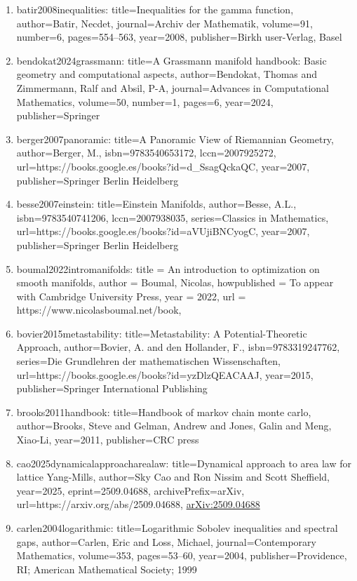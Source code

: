 \documentclass[11pt]{article}
\begin{document}
\begin{enumerate}[leftmargin=*]
  \item batir2008inequalities: title=Inequalities for the gamma function, author=Batir, Necdet, journal=Archiv der Mathematik, volume=91, number=6, pages=554--563, year=2008, publisher=Birkh user-Verlag, Basel
  \item bendokat2024grassmann: title=A Grassmann manifold handbook: Basic geometry and computational aspects, author=Bendokat, Thomas and Zimmermann, Ralf and Absil, P-A, journal=Advances in Computational Mathematics, volume=50, number=1, pages=6, year=2024, publisher=Springer
  \item berger2007panoramic: title=A Panoramic View of Riemannian Geometry, author=Berger, M., isbn=9783540653172, lccn=2007925272, url=https://books.google.es/books?id=d\_SsagQckaQC, year=2007, publisher=Springer Berlin Heidelberg
  \item besse2007einstein: title=Einstein Manifolds, author=Besse, A.L., isbn=9783540741206, lccn=2007938035, series=Classics in Mathematics, url=https://books.google.es/books?id=aVUjiBNCyogC, year=2007, publisher=Springer Berlin Heidelberg
  \item boumal2022intromanifolds: title = An introduction to optimization on smooth manifolds, author = Boumal, Nicolas, howpublished = To appear with Cambridge University Press, year = 2022, url = https://www.nicolasboumal.net/book,
  \item bovier2015metastability: title=Metastability: A Potential-Theoretic Approach, author=Bovier, A. and den Hollander, F., isbn=9783319247762, series=Die Grundlehren der mathematischen Wissenschaften, url=https://books.google.es/books?id=yzDlzQEACAAJ, year=2015, publisher=Springer International Publishing
  \item brooks2011handbook: title=Handbook of markov chain monte carlo, author=Brooks, Steve and Gelman, Andrew and Jones, Galin and Meng, Xiao-Li, year=2011, publisher=CRC press
  \item cao2025dynamicalapproacharealaw: title=Dynamical approach to area law for lattice Yang-Mills, author=Sky Cao and Ron Nissim and Scott Sheffield, year=2025, eprint=2509.04688, archivePrefix=arXiv, url=https://arxiv.org/abs/2509.04688, \href{https://arxiv.org/abs/2509.04688}{arXiv:2509.04688}
  \item carlen2004logarithmic: title=Logarithmic Sobolev inequalities and spectral gaps, author=Carlen, Eric and Loss, Michael, journal=Contemporary Mathematics, volume=353, pages=53--60, year=2004, publisher=Providence, RI; American Mathematical Society; 1999

\end{enumerate}
\end{document}
